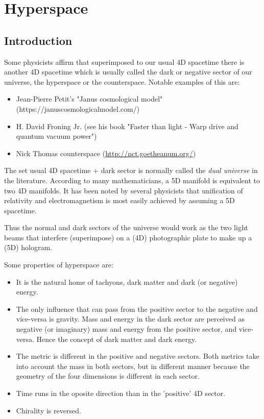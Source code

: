 \chapter{Hyperspace}

\section{Introduction}

Some physicists affirm that superimposed to our usual 4D spacetime there is another 4D spacetime which is usually called the dark or negative sector of our universe, the hyperspace or the counterspace. Notable examples of this are:

\begin{itemize}
	\item Jean-Pierre Petit's "Janus cosmological model" (https://januscosmologicalmodel.com/)
	\item H. David Froning Jr. (see his book "Faster than light - Warp drive and quantum vacuum power")
	\item Nick Thomas counterspace (\href{http://nct.goetheanum.org/}{http://nct.goetheanum.org/})
	
\end{itemize}

The set usual 4D spacetime + dark sector is normally called the \emph{dual universe} in the literature. According to many mathematicians, a 5D manifold is equivalent to two 4D manifolds. It has been noted by several physicists that unification of relativity and electromagnetism is most easily achieved by assuming a 5D spacetime.

Thus the normal and dark sectors of the universe would work as the two light beams that interfere (superimpose) on a (4D) photographic plate to make up a (5D) hologram.

Some properties of hyperspace are:

\begin{itemize}
	\item It is the natural home of tachyons, dark matter and dark (or negative) energy.
	\item The only influence that can pass from the positive sector to the negative and vice-versa is gravity. Mass and energy in the dark sector are perceived as negative (or imaginary) mass and energy from the positive sector, and vice-versa. Hence the concept of dark matter and dark energy.
	\item The metric is different in the positive and negative sectors. Both metrics take into account the mass in both sectors, but in different manner because the geometry of the four dimensions is different in each sector.
	\item Time runs in the oposite direction than in the 'positive' 4D sector.
	\item Chirality is reversed.
\end{itemize}

